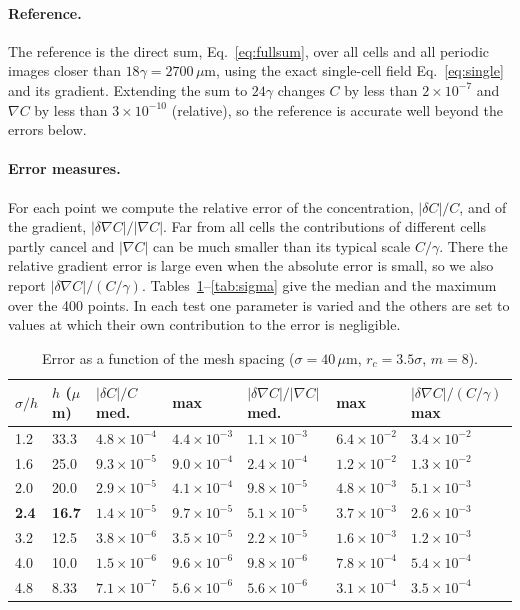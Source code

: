 \documentclass[11pt,a4paper]{article}
\newcommand{\um}{\,\mu\mathrm{m}}
\begin{document}
\paragraph{Reference.} The reference is the direct sum, Eq.~\eqref{eq:fullsum}, over all cells and
all periodic images closer than $18\gamma = 2700\um$, using the exact single-cell field
Eq.~\eqref{eq:single} and its gradient. Extending the sum to $24\gamma$ changes $C$ by less than
$2\times10^{-7}$ and $\nabla C$ by less than $3\times10^{-10}$ (relative), so the reference is
accurate well beyond the errors below.

\paragraph{Error measures.} For each point we compute the relative error of the concentration,
$|\delta C|/C$, and of the gradient, $|\delta\nabla C|/|\nabla C|$. Far from all cells the
contributions of different cells partly cancel and $|\nabla C|$ can be much smaller than its
typical scale $C/\gamma$. There the relative gradient error is large even when the absolute error is
small, so we also report $|\delta\nabla C|/(C/\gamma)$. Tables~\ref{tab:h}--\ref{tab:sigma} give
the median and the maximum over the 400 points. In each test one parameter is varied and the
others are set to values at which their own contribution to the error is negligible.

\begin{table}[h]
  \centering\small
  \begin{tabular}{lllllll}
    \toprule
    $\sigma/h$ & $h$ ($\mu$m) & $|\delta C|/C$ med. & max & $|\delta\nabla C|/|\nabla C|$ med. & max & $|\delta\nabla C|/(C/\gamma)$ max \\
    \midrule
    1.2 & 33.3 & $4.8\times10^{-4}$ & $4.4\times10^{-3}$ & $1.1\times10^{-3}$ & $6.4\times10^{-2}$ & $3.4\times10^{-2}$ \\
    1.6 & 25.0 & $9.3\times10^{-5}$ & $9.0\times10^{-4}$ & $2.4\times10^{-4}$ & $1.2\times10^{-2}$ & $1.3\times10^{-2}$ \\
    2.0 & 20.0 & $2.9\times10^{-5}$ & $4.1\times10^{-4}$ & $9.8\times10^{-5}$ & $4.8\times10^{-3}$ & $5.1\times10^{-3}$ \\
    \textbf{2.4} & \textbf{16.7} & $1.4\times10^{-5}$ & $9.7\times10^{-5}$ & $5.1\times10^{-5}$ & $3.7\times10^{-3}$ & $2.6\times10^{-3}$ \\
    3.2 & 12.5 & $3.8\times10^{-6}$ & $3.5\times10^{-5}$ & $2.2\times10^{-5}$ & $1.6\times10^{-3}$ & $1.2\times10^{-3}$ \\
    4.0 & 10.0 & $1.5\times10^{-6}$ & $9.6\times10^{-6}$ & $9.8\times10^{-6}$ & $7.8\times10^{-4}$ & $5.4\times10^{-4}$ \\
    4.8 & 8.33 & $7.1\times10^{-7}$ & $5.6\times10^{-6}$ & $5.6\times10^{-6}$ & $3.1\times10^{-4}$ & $3.5\times10^{-4}$ \\
    \bottomrule
  \end{tabular}
  \caption{Error as a function of the mesh spacing ($\sigma = 40\um$, $r_c = 3.5\sigma$, $m = 8$).}
  \label{tab:h}
\end{table}
\end{document}
